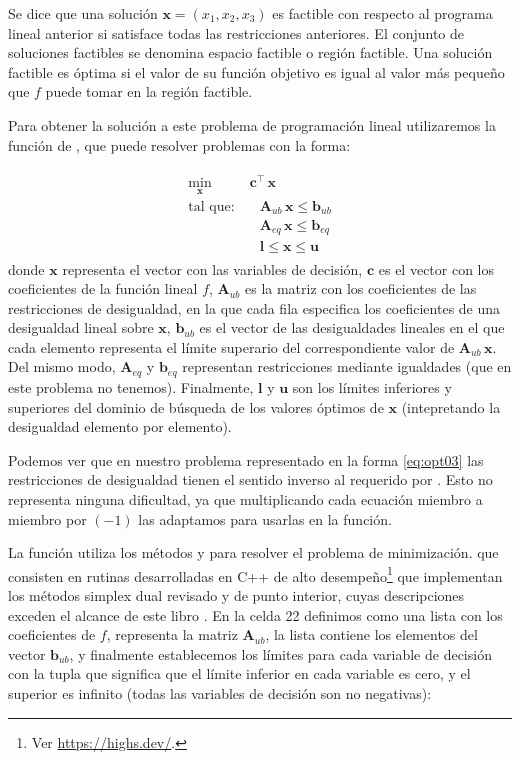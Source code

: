 Se dice que una solución $\bm{x} = (x_1, x_2, x_3)$ es factible con respecto al programa lineal anterior si satisface todas las restricciones anteriores. El conjunto de soluciones factibles se denomina espacio factible o región factible. Una solución factible es óptima si el valor de su función objetivo es igual al valor más pequeño que $f$ puede tomar en la región factible.

Para obtener la solución a este problema de programación lineal utilizaremos la función  de , que puede resolver problemas con la forma:

\begin{align}
 \begin{split}
 \min_{\bm{x}} & \; \bm{c}^{\intercal} \, \bm{x} \\
 \text{tal que:}& \quad \bm{A}_{ub} \, \bm{x} \leq \bm{b}_{ub} \\
 & \quad \bm{A}_{eq} \, \bm{x} \leq \bm{b}_{eq} \\
 & \quad  \bm{l} \leq \bm{x} \leq \bm{u}
 \end{split}
 \label{eq:opt04}
\end{align}
donde $\bm{x}$ representa el vector con las variables de decisión, $\bm{c}$ es el vector con los coeficientes de la función lineal $f$, $\bm{A}_{ub}$ es la matriz con los coeficientes de las restricciones de desigualdad, en la que cada fila especifica los coeficientes de una desigualdad lineal sobre $\bm{x}$, $\bm{b}_{ub}$ es el vector de las desigualdades lineales en el que cada elemento representa el límite superario del correspondiente valor de $\bm{A}_{ub} \, \bm{x}$. Del mismo modo, $\bm{A}_{eq}$ y $\bm{b}_{eq}$ representan restricciones mediante igualdades (que en este problema no tenemos). Finalmente, $\bm{l}$ y $\bm{u}$ son los límites inferiores y superiores del dominio de búsqueda de los valores óptimos de $\bm{x}$ (intepretando la desigualdad elemento por elemento).

Podemos ver que en nuestro problema representado en la forma \eqref{eq:opt03} las restricciones de desigualdad tienen el sentido inverso al requerido por . Esto no representa ninguna dificultad, ya que multiplicando cada ecuación miembro a miembro por $(-1)$ las adaptamos para usarlas en la función. 

La función  utiliza los métodos  y  para resolver el problema de minimización. que consisten en rutinas desarrolladas en C++ de alto desempeño\footnote{Ver \url{https://highs.dev/}.} que implementan los métodos simplex dual revisado y de punto interior, cuyas descripciones exceden el alcance de este libro \cite{huangfu2018}. En la celda 22 definimos  como una lista con los coeficientes de $f$,  representa la matriz $\bm{A}_{ub}$, la lista  contiene los elementos del vector $\bm{b}_{ub}$, y finalmente establecemos los límites para cada variable de decisión con la tupla  que significa que el límite inferior en cada variable es cero, y el superior es infinito (todas las variables de decisión son no negativas):

